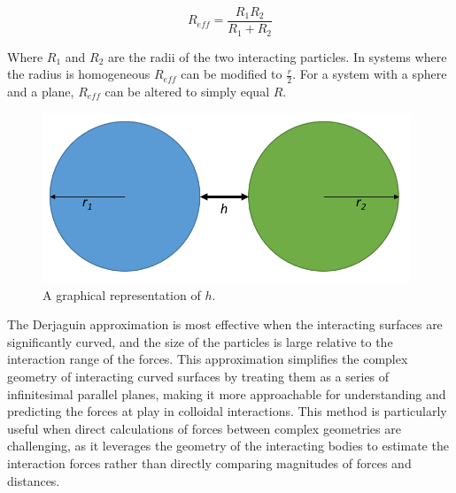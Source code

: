 \begin{equation} %
R_{eff} = \frac{R_1R_2}{R_1 + R_2}
\end{equation}

Where $R_1$ and $R_2$ are the radii of the two interacting particles. In systems where the radius is homogeneous $R_{eff}$ can be modified to $\frac{r}{2}$. For a system with a sphere and a plane, $R_{eff}$ can be altered to simply equal $R$.

\begin{figure}[h]     %
        \begin{center}
          \includegraphics[width=110mm]{chapter1/h_graph.PNG}
\end{center}
\caption{A graphical representation of $h$.}
\label{fig:h_graph}                 %
\end{figure}

The Derjaguin approximation is most effective when the interacting surfaces are significantly curved, and the size of the particles is large relative to the interaction range of the forces. This approximation simplifies the complex geometry of interacting curved surfaces by treating them as a series of infinitesimal parallel planes, making it more approachable for understanding and predicting the forces at play in colloidal interactions. This method is particularly useful when direct calculations of forces between complex geometries are challenging, as it leverages the geometry of the interacting bodies to estimate the interaction forces rather than directly comparing magnitudes of forces and distances.

\cite{smolBook1} \cite{Origin2V} \cite{IsGreenBook} \cite{surfpattQ}\cite{Surfquestion} %



